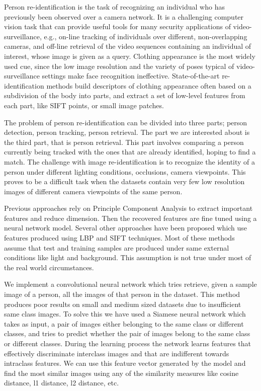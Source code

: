 \documentclass{article}[12pt,a4paper]
\begin{document}
Person re-identification is the task of recognizing an individual who has previously been observed over a camera network. It is a challenging computer vision task that can provide useful tools for many security applications of video-surveillance, e.g., on-line tracking of individuals over different, non-overlapping cameras, and off-line retrieval of the video sequences containing an individual of interest, whose image is given as a query. Clothing appearance is the most widely used cue, since the low image resolution and the variety of poses typical of video-surveillance settings make face recognition ineffective. State-of-the-art re-identification methods build descriptors of clothing appearance often based on a subdivision of the body into parts, and extract a set of low-level features from each part, like SIFT points, or small image patches.

The problem of person re-identification can be divided into three parts; person detection, person tracking, person retrieval. The part we are interested about is the third part, that is person retrieval. This part involves comparing a person currently being tracked with the ones that are already identified, hoping to find a match. The challenge with image re-identification is to recognize the identity of a person under different lighting conditions, occlusions, camera viewpoints. This proves to be a difficult task when the datasets contain very few low resolution images of different camera viewpoints of the same person.

Previous approaches rely on Principle Component Analysis to extract important features and reduce dimension. Then the recovered features are fine tuned using a neural network model. Several other approaches have been proposed which use features produced using LBP and SIFT techniques. Most of these methods assume that test and training samples are produced under same external conditions like light and background. This assumption is not true under most of the real world circumstances.

We implement a convolutional neural network which tries retrieve, given a sample image of a person, all the images of that person in the dataset. This method produces poor results on small and medium sized datasets due to insufficient same class images. To solve this we have used a Siamese neural network which takes as input, a pair of images either belonging to the same class or different classes, and tries to predict whether the pair of images belong to the same class or different classes. During the learning process the network learns features that effectively discriminate interclass images and that are indifferent towards intraclass features. We can use this feature vector generated by the model and find the most similar images using any of the similarity measures like cosine distance, l1 distance, l2 distance, etc. 
\end{document}
